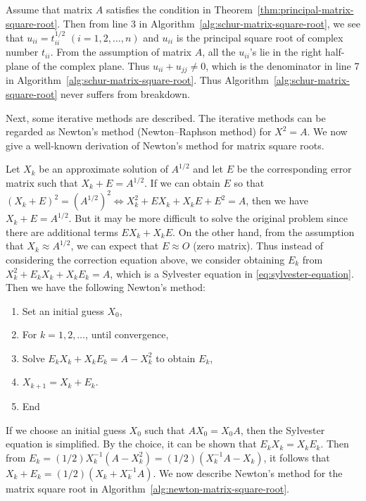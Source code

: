 {Assume that matrix $A$ satisfies the condition in Theorem~\ref{thm:principal-matrix-square-root}. Then from line 3 in Algorithm~\ref{alg:schur-matrix-square-root}, we see that $u_{ii}=t_{ii}^{1/2}$ $(i=1,2,\ldots,n)$ and $u_{ii}$ is the principal square root of complex number $t_{ii}$. From the assumption of matrix $A$, all the $u_{ii}$'s lie in the right half-plane of the complex plane. Thus $u_{ii}+u_{jj}\ne0$, which is the denominator in line 7 in Algorithm~\ref{alg:schur-matrix-square-root}. Thus Algorithm~\ref{alg:schur-matrix-square-root} never suffers from breakdown.}

{Next, some iterative methods are described. The iterative methods can be regarded as Newton's method (Newton--Raphson method) for $X^2=A$. We now give a well-known derivation of Newton's method for matrix square roots.}

{Let $X_k$ be an approximate solution of $A^{1/2}$ and let $E$ be the corresponding error matrix such that $X_k+E=A^{1/2}$. If we can obtain $E$ so that $(X_k+E)^2=(A^{1/2})^2\Leftrightarrow X_k^2+EX_k+X_kE+E^2=A$, then we have $X_k+E=A^{1/2}$. But it may be more difficult to solve the original problem since there are additional terms $EX_k+X_kE$. On the other hand, from the assumption that $X_k\approx A^{1/2}$, we can expect that $E\approx O$ (zero matrix). Thus instead of considering the correction equation above, we consider obtaining $E_k$ from $X_k^2+E_kX_k+X_kE_k=A$, which is a Sylvester equation in \eqref{eq:sylvester-equation}. Then we have the following Newton's method:}
\begin{enumerate}[label=\arabic*.]
\item {Set an initial guess $X_0$,}
\item {For $k=1,2,\ldots$, until convergence,}
\item {Solve $E_kX_k+X_kE_k=A-X_k^2$ to obtain $E_k$,}
\item $X_{k+1}=X_k+E_k$.
\item {End}
\end{enumerate}

{If we choose an initial guess $X_0$ such that $AX_0=X_0A$, then the Sylvester equation is simplified. By the choice, it can be shown that $E_kX_k=X_kE_k$. Then from $E_k=(1/2)X_k^{-1}(A-X_k^2)=(1/2)(X_k^{-1}A-X_k)$, it follows that $X_k+E_k=(1/2)(X_k+X_k^{-1}A)$. We now describe Newton's method for the matrix square root in Algorithm~\ref{alg:newton-matrix-square-root}.}

